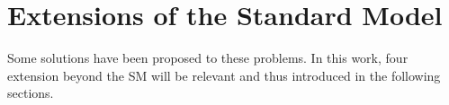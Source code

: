 \section{Extensions of the Standard Model}
Some solutions have been proposed to these problems. In this work, four extension beyond the \acl{SM} will be relevant and thus introduced in the following sections.
%
%
%
%
%


